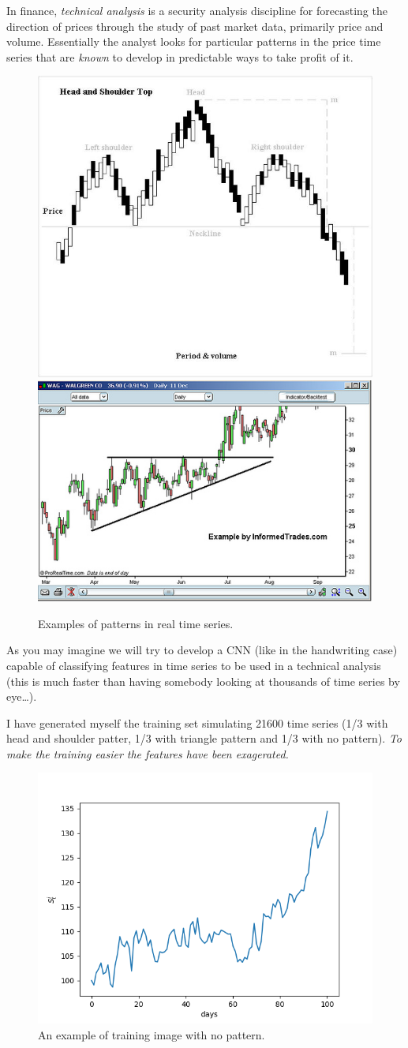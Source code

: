 In finance, \emph{technical analysis} is a security analysis discipline
for forecasting the direction of prices through the study of past market
data, primarily price and volume. Essentially the analyst looks for
particular patterns in the price time series that are \emph{known} to
develop in predictable ways to take profit of it.

\begin{figure}[htb]
	\centering
	\includegraphics[width=0.4\linewidth]{figures/H_and_s_top_new.jpg}\qquad
	\includegraphics[width=0.4\linewidth]{figures/Triangle-ascending.jpg}
	\caption{Examples of patterns in real time series.}
\end{figure}

As you may imagine we will try to develop a CNN (like in the handwriting
case) capable of classifying features in time series to be used in a
technical analysis (this is much faster than having somebody looking at
thousands of time series by eye\ldots{}).

I have generated myself the training set simulating 21600 time series
(1/3 with head and shoulder patter, 1/3 with triangle pattern and 1/3
with no pattern). \emph{To make the training easier the features have
been exagerated.}

\begin{figure}
	\centering
	\includegraphics[width=0.5\linewidth]{figures/image_1.png}
	\caption{An example of training image with no pattern.}
\end{figure}

